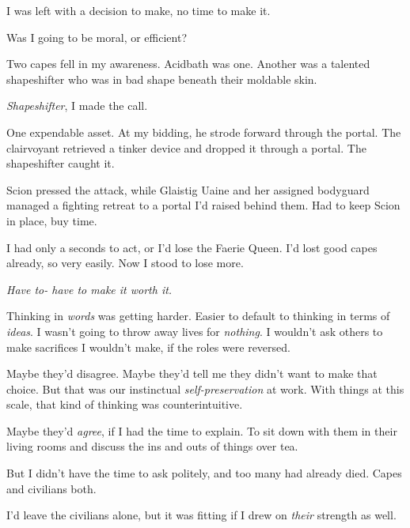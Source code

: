 I was left with a decision to make, no time to make it.



Was I going to be moral, or efficient?



Two capes fell in my awareness.  Acidbath was one.  Another was a talented shapeshifter who was in bad shape beneath their moldable skin.



\emph{Shapeshifter}, I made the call.



One expendable asset.  At my bidding, he strode forward through the portal.  The clairvoyant retrieved a tinker device and dropped it through a portal.  The shapeshifter caught it.



Scion pressed the attack, while Glaistig Uaine and her assigned bodyguard managed a fighting retreat to a portal I'd raised behind them.  Had to keep Scion in place, buy time.



I had only a seconds to act, or I'd lose the Faerie Queen.  I'd lost good capes already, so very easily.  Now I stood to lose more.



\emph{Have to-  have to make it worth it.}



Thinking in \emph{words} was getting harder.  Easier to default to thinking in terms of \emph{ideas}.  I wasn't going to throw away lives for \emph{nothing}.  I wouldn't ask others to make sacrifices I wouldn't make, if the roles were reversed.



Maybe they'd disagree.  Maybe they'd tell me they didn't want to make that choice.  But that was our instinctual \emph{self-preservation} at work.  With things at this scale, that kind of thinking was counterintuitive.



Maybe they'd \emph{agree}, if I had the time to explain.  To sit down with them in their living rooms and discuss the ins and outs of things over tea.



But I didn't have the time to ask politely, and too many had already died.  Capes and civilians both.



I'd leave the civilians alone, but it was fitting if I drew on \emph{their} strength as well.




